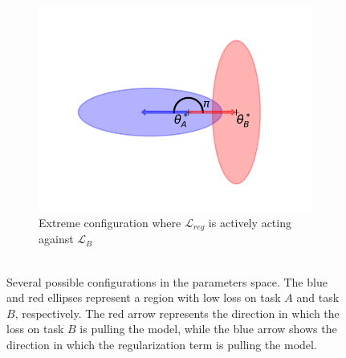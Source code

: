 \documentclass[11pt]{article}
\begin{document}
\begin{figure}
\begin{subfigure}[b]{0.3\textwidth}
        \label{fig:two_ellipses_90}
    \end{subfigure}
    \hspace{-0mm}
    \begin{subfigure}[b]{0.3\textwidth}
        \centering
        \includegraphics[width=0.99\textwidth]{images/ellipse_overlap_180.png}
        \caption{Extreme configuration where $\mathcal{L}_{reg}$ is actively acting against $\mathcal{L}_B$ \\
         \\}
        \label{fig:two_ellipses_180}
    \end{subfigure}
    \caption{Several possible configurations in the parameters space. The blue and red ellipses represent a region with low loss on task $A$ and task $B$, respectively. The red arrow represents the direction in which the loss on task $B$ is pulling the model, while the blue arrow shows the direction in which the regularization term is pulling the model.}
    \label{fig:other_ellipses}
\end{figure}
\end{document}
